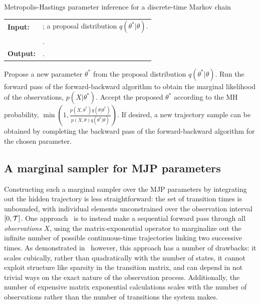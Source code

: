 \begin{algorithm}[H]
  \caption{Metropolis-Hastings parameter inference for a discrete-time 
Markov chain}
   \label{alg:disc_time_mh}
  \begin{tabular}{l l}
   \textbf{Input:  } & \text{A set of partial and noisy observations $X$};
    a proposal distribution $q(\theta^*|\theta)$. \\
  & \text{The previous Markov chain parameters $\theta$}.\\
  \textbf{Output:  }& \text{A new Markov chain parameter $\theta^*$}.\\
   \hline
   \end{tabular}
   \begin{algorithmic}[1]
  \State Propose a new parameter $\theta^*$ from the proposal distribution
    $q(\theta^*|\theta)$.
  \State Run the forward pass of the forward-backward algorithm to 
    obtain the marginal likelihood of the observations, $p(X|\theta^*)$.
  \State Accept the proposed $\theta^*$ according to the MH probability, 
    $\min(1,\frac{p(X,\theta^*)q(\theta|\theta^*)}{p(X,\theta)q(\theta^*|\theta)})$.
  \State If desired, a new trajectory sample can be obtained by
    completing the backward pass of the forward-backward algorithm for the chosen
    parameter.
\end{algorithmic}
\end{algorithm}

\subsection{A marginal sampler for MJP parameters} 
Constructing such a marginal sampler over the MJP parameters by
integrating out the hidden trajectory is less straightforward:
the set of transition times is unbounded, with individual elements
unconstrained over the observation interval $[0,{\mathcal T}]$.
One approach~\cite{FearnSher2006} is to instead make a sequential 
forward pass through all {\em observations} $X$, using the matrix-exponential
operator to marginalize out the infinite number of possible 
continuous-time trajectories linking two successive times. As
demonstrated in~\cite{RaoTeh13} however, this approach has a number of 
drawbacks: it scales cubically, rather than quadratically with the 
number of states, it cannot exploit structure like sparsity in the 
transition matrix, and can depend in not trivial ways on the exact 
nature of the observation process.
Additionally, the number of expensive matrix exponential calculations scales
with the number of observations rather than the number of transitions the
system makes.

